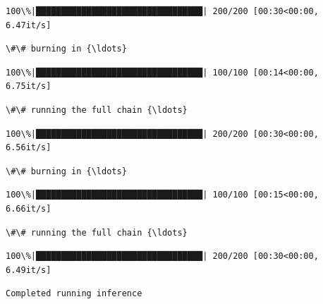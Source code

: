 \documentclass[11pt]{article}
\begin{document}
    \begin{Verbatim}[commandchars=\\\{\}]
100\%|█████████████████████████████████| 200/200 [00:30<00:00,  6.47it/s]
    \end{Verbatim}

    \begin{Verbatim}[commandchars=\\\{\}]
\#\# burning in {\ldots}
    \end{Verbatim}

    \begin{Verbatim}[commandchars=\\\{\}]
100\%|█████████████████████████████████| 100/100 [00:14<00:00,  6.75it/s]
    \end{Verbatim}

    \begin{Verbatim}[commandchars=\\\{\}]
\#\# running the full chain {\ldots}
    \end{Verbatim}

    \begin{Verbatim}[commandchars=\\\{\}]
100\%|█████████████████████████████████| 200/200 [00:30<00:00,  6.56it/s]
    \end{Verbatim}

    \begin{Verbatim}[commandchars=\\\{\}]
\#\# burning in {\ldots}
    \end{Verbatim}

    \begin{Verbatim}[commandchars=\\\{\}]
100\%|█████████████████████████████████| 100/100 [00:15<00:00,  6.66it/s]
    \end{Verbatim}

    \begin{Verbatim}[commandchars=\\\{\}]
\#\# running the full chain {\ldots}
    \end{Verbatim}

    \begin{Verbatim}[commandchars=\\\{\}]
100\%|█████████████████████████████████| 200/200 [00:30<00:00,  6.49it/s]
    \end{Verbatim}

    \begin{Verbatim}[commandchars=\\\{\}]
Completed running inference
    \end{Verbatim}
\end{document}
